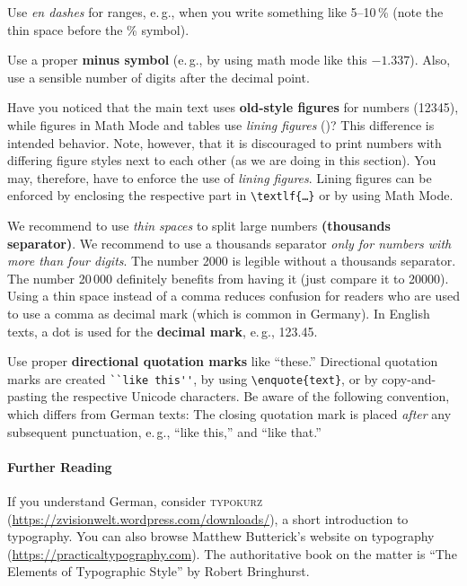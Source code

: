 Use \emph{en dashes} for ranges, e.\,g., when you write something like 5--10\,\% (note the thin space before the \% symbol).

Use a proper \textbf{minus symbol} (e.\,g., by using math mode like this \(-1.337\)). Also, use a sensible number of digits after the decimal point.

Have you noticed that the main text uses \textbf{old-style figures} for numbers (12345), while figures in Math Mode and tables use \emph{lining figures} ()? This difference is intended behavior. Note, however, that it is discouraged to print numbers with differing figure styles next to each other (as we are doing in this section). You may, therefore, have to enforce the use of \emph{lining figures}. Lining figures can be enforced by enclosing the respective part in \verb|\textlf{…}| or by using Math Mode.

We recommend to use \emph{thin spaces} to split large numbers \textbf{(thousands separator)}. We recommend to use a thousands separator \emph{only for numbers with more than four digits}. The number 2000 is legible without a thousands separator. The number 20\,000 definitely benefits from having it (just compare it to 20000). Using a thin space instead of a comma reduces confusion for readers who are used to use a comma as decimal mark (which is common in Germany). In English texts, a dot is used for the \textbf{decimal mark}, e.\,g., 123.45.

Use proper \textbf{directional quotation marks} like ``these.'' Directional quotation marks are created  \verb|``like this''|, by using \verb|\enquote{text}|, or by copy-and-pasting the respective Unicode characters. Be aware of the following convention, which differs from German texts: The closing quotation mark is placed \emph{after} any subsequent punctuation, e.\,g., ``like this,'' and ``like that.''

\paragraph{Further Reading}

If you understand German, consider \textsc{typokurz} (\url{https://zvisionwelt.wordpress.com/downloads/}), a short introduction to typography. You can also browse Matthew Butterick's website on typography (\url{https://practicaltypography.com}). The authoritative book on the matter is ``The Elements of Typographic Style'' by Robert Bringhurst.

